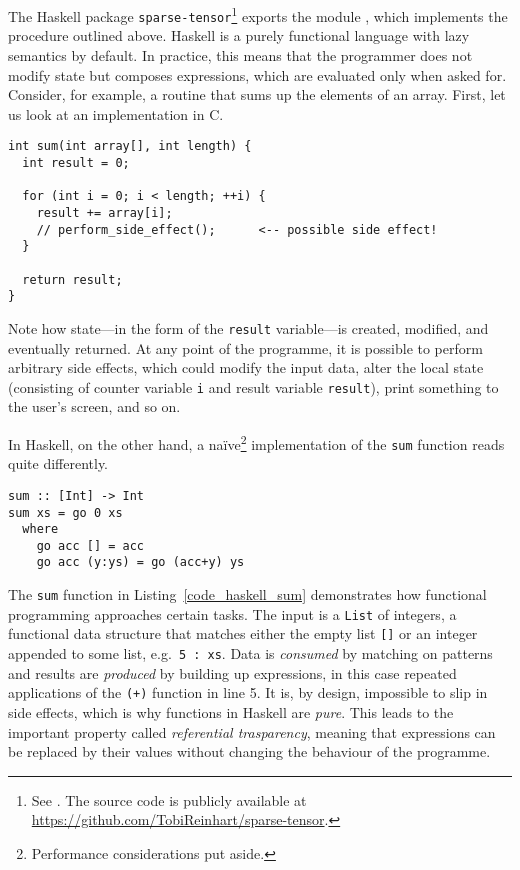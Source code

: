 The Haskell package \texttt{sparse-tensor}\footnote{See \cite{Reinhart_2019_sparse-tensor}. The source code is publicly available at \url{https://github.com/TobiReinhart/sparse-tensor}.} exports the module \texttt{}, which implements the procedure outlined above. Haskell is a purely functional language with lazy semantics by default. \cite{Marlow_2010} In practice, this means that the programmer does not modify state but composes expressions, which are evaluated only when asked for. Consider, for example, a routine that sums up the elements of an array. First, let us look at an implementation in C.
\begin{code}
  \begin{verbatim}
int sum(int array[], int length) {
  int result = 0;

  for (int i = 0; i < length; ++i) {
    result += array[i];
    // perform_side_effect();      <-- possible side effect!
  }

  return result;
}
  \end{verbatim}
\end{code}
Note how state---in the form of the \texttt{result} variable---is created, modified, and eventually returned. At any point of the programme, it is possible to perform arbitrary side effects, which could modify the input data, alter the local state (consisting of counter variable \texttt{i} and result variable \texttt{result}), print something to the user's screen, and so on.

In Haskell, on the other hand, a na\"ive\footnote{Performance considerations put aside.} implementation of the \texttt{sum} function reads quite differently.
\begin{code}
  \begin{verbatim}
sum :: [Int] -> Int
sum xs = go 0 xs
  where
    go acc [] = acc
    go acc (y:ys) = go (acc+y) ys
  \end{verbatim}
  \label{code_haskell_sum}
\end{code}
The \texttt{sum} function in Listing~\ref{code_haskell_sum} demonstrates how functional programming approaches certain tasks. The input is a \texttt{List} of integers, a functional data structure that matches either the empty list \texttt{[]} or an integer appended to some list, e.g.\ \texttt{5 : xs}. Data is \emph{consumed} by matching on patterns and results are \emph{produced} by building up expressions, in this case repeated applications of the \texttt{(+)} function in line 5. It is, by design, impossible to slip in side effects, which is why functions in Haskell are \emph{pure}. This leads to the important property called \emph{referential trasparency}, meaning that expressions can be replaced by their values without changing the behaviour of the programme.

